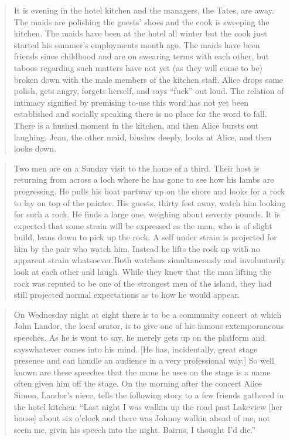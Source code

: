 \documentclass[twoside,symmetric,nobib,justified]{tufte-book}
\begin{document}
\begin{quote}
It is evening in the hotel kitchen and the managers, the Tates, are
away. The maids are polishing the guests' shoes and the cook is sweeping
the kitchen. The maids have been at the hotel all winter but the cook
just started his summer's employments month ago. The maids have been
friends since childhood and are on swearing terms with each other, but
taboos regarding such matters have not yet (as they will come to be)
broken down with the male members of the kitchen staff. Alice drops some
polish, gets angry, forgets herself, and says ``fuck'' out loud. The
relation of intimacy signified by premising to-use this word has not yet
been established and socially speaking there is no place for the word to
fall. There is a hushed moment in the kitchen, and then Alice bursts out
laughing. Jean, the other maid, blushes deeply, looks at Alice, and then
looks down.
\end{quote}

\begin{quote}
Two men are on a Sunday visit to the home of a third. Their host is
returning from across a loch where he has gone to see how his lambs are
progressing. He pulls his boat partway up on the shore and looks for a
rock to lay on top of the painter. His guests, thirty feet away, watch
him looking for such a rock. He finds a large one, weighing about
seventy pounds. It is expected that some strain will be expressed as the
man, who is of slight build, leans down to pick up the rock. A self
under strain is projected for him by the pair who watch him. Instead he
lifts the rock up with no apparent strain whatsoever.Both watchers
simultaneously and involuntarily look at each other and laugh. While
they knew that the man lifting the rock was reputed to be one of the
strongest men of the island, they had still projected normal
expectations as to how he would appear.
\end{quote}

\begin{quote}
On Wednesday night at eight there is to be a community concert at which
John Landor, the local orator, is to give one of his famous
extemporaneous speeches. As he is wont to say, he merely gets up on the
platform and says\newpage\noindent whatever comes into his mind. {[}He has, incidentally,
great stage presence and can handle an audience in a very professional
way.{]} So well known are these speeches that the name he uses on the
stage is a name often given him off the stage. On the morning after the
concert Alice Simon, Landor's niece, tells the following story to a few
friends gathered in the hotel kitchen: ``Last night I was walkin up the
road past Lakeview {[}her house{]} about six o'clock and there was
Johnny walkin ahead of me, not seein me, givin his speech into the
night. Bairns, I thought I'd die.''
\end{quote}
\end{document}
